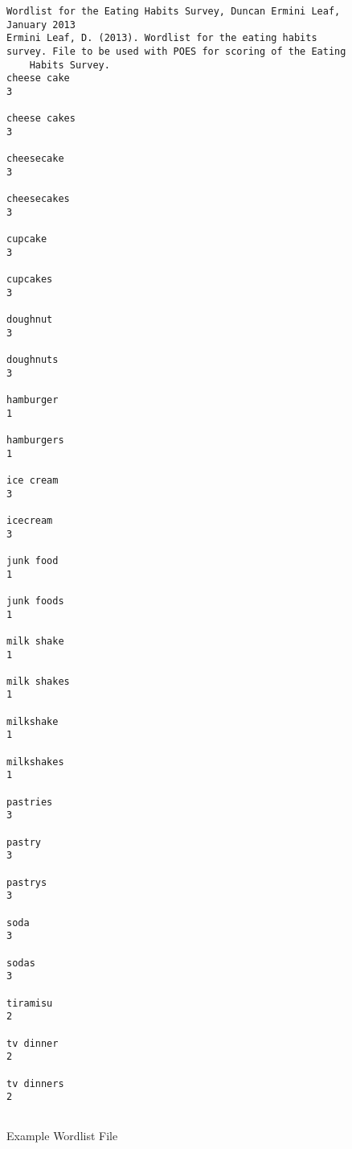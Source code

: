 \documentclass[11pt]{article}
\numberwithin{figure}{section}
\numberwithin{table}{section}
\begin{document}
\newpage\begin{figure}[htbp]
\caption{Example Wordlist File}
\label{fig:sampwordlist}
\tiny
\begin{verbatim}
Wordlist for the Eating Habits Survey, Duncan Ermini Leaf, January 2013
Ermini Leaf, D. (2013). Wordlist for the eating habits survey. File to be used with POES for scoring of the Eating 
    Habits Survey. 
cheese cake
3

cheese cakes
3

cheesecake
3

cheesecakes
3

cupcake
3

cupcakes
3

doughnut
3

doughnuts
3

hamburger
1

hamburgers
1

ice cream
3

icecream
3

junk food
1

junk foods
1

milk shake
1

milk shakes
1

milkshake
1

milkshakes
1

pastries
3

pastry
3

pastrys
3

soda
3

sodas
3

tiramisu
2

tv dinner
2

tv dinners
2
 
\end{verbatim}
\end{figure}
\end{document}
